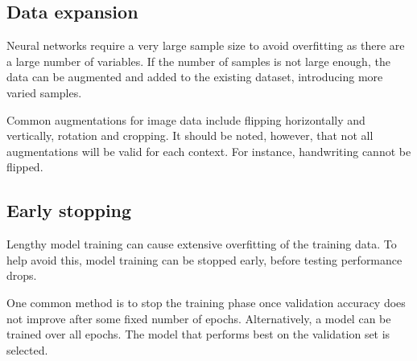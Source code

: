 \subsection*{Data expansion}

Neural networks require a very large sample size to avoid overfitting as there are a large number of variables. If the number of samples is not large enough, the data can be augmented and added to the existing dataset, introducing more varied samples.

Common augmentations for image data include flipping horizontally and vertically, rotation and cropping. It should be noted, however, that not all augmentations will be valid for each context. For instance, handwriting cannot be flipped. 

\subsection*{Early stopping}\label{nnets-earlystop}

Lengthy model training can cause extensive overfitting of the training data. To help avoid this, model training can be stopped early, before testing performance drops.

One common method is to stop the training phase once validation accuracy does not improve after some fixed number of epochs. Alternatively, a model can be trained over all epochs. The model that performs best on the validation set is selected.









